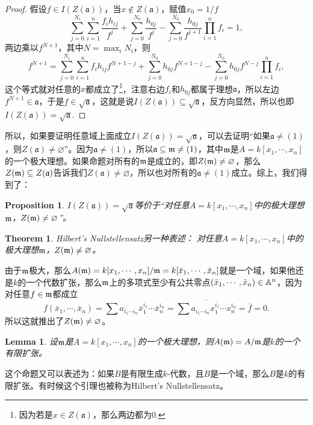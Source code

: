\documentclass[9pt]{extarticle}
\theoremstyle{plain}%
\newtheorem{pro}[defi]{Proposition}%
\newtheorem{theo}[defi]{Theorem}%
\newtheorem{lem}[defi]{Lemma}%
\begin{document}
\begin{proof}
	假设$f\in I(Z(\mathfrak{a}))$，当$x\notin Z(\mathfrak{a})$，赋值$x_0=1/f$
	\[
		\sum_{j=0}^{N_i}\sum_{i=1}^{n}\frac{f_ih_{ij}}{f^j}+\sum_{j=0}^{N_{0}}\frac{h_{0j}}{f^j}-\sum_{j=0}^{N_{0}}\frac{h_{0j}}{f^{j+1}}\prod_{i=1}^nf_i=1,
	\]
	两边乘以$f^{N+1}$，其中$N=\max_iN_i$，则
	\[
		f^{N+1}=\sum_{j=0}^{N_i}\sum_{i=1}^{n}f_ih_{ij}f^{N+1-j}+\sum_{j=0}^{N_{0}}h_{0j}f^{N+1-j}-\sum_{j=0}^{N_{0}}h_{0j}f^{N-j}\prod_{i=1}^nf_i,
	\]
	这个等式就对任意的$x$都成立了\footnote{因为若是$x\in Z(\mathfrak{a})$，那么两边都为$0$.}，注意右边$f_i$和$h_{0j}$都属于理想$\mathfrak{a}$，所以左边$f^{N+1}\in \mathfrak{a}$，于是$f\in \sqrt{\mathfrak{a}}$，这就是说$I(Z(\mathfrak{a}))\subseteq \sqrt{\mathfrak{a}}$，反方向显然，所以也即$I(Z(\mathfrak{a}))=\sqrt{\mathfrak{a}}$.
\end{proof}
	
所以，如果要证明任意域上面成立$I(Z(\mathfrak{a}))=\sqrt{\mathfrak{a}}$，可以去证明“如果$\mathfrak{a}\neq(1)$，则$Z(\mathfrak{a})\neq\varnothing$”。因为$\mathfrak{a}\neq(1)$，所以$\mathfrak{a}\subseteq \mathfrak{m} \neq(1)$，其中$\mathfrak{m}$是$A=k[x_1,\cdots,x_n]$的一个极大理想。如果命题对所有的$\mathfrak{m}$是成立的，即$Z(\mathfrak{m})\neq \varnothing$，那么$Z(\mathfrak{m})\subseteq Z(\mathfrak{a})$告诉我们$Z(\mathfrak{a})\neq \varnothing$，所以也对所有的$\mathfrak{a}\neq (1)$成立。综上，我们得到了：
\begin{pro}
$I(Z(\mathfrak{a}))=\sqrt{\mathfrak{a}}$等价于“对任意$A=k[x_1,\cdots,x_n]$中的极大理想$\mathfrak{m}$，$Z(\mathfrak{m})\neq\varnothing$”。
\end{pro}
\begin{theo}Hilbert's Nullstellensatz另一种表述：
对任意$A=k[x_1,\cdots,x_n]$中的极大理想$\mathfrak{m}$，$Z(\mathfrak{m})\neq\varnothing$。
\end{theo}
	由于$\mathfrak{m}$极大，那么$A(\mathfrak{m})=k[x_1,\cdots,x_n]/\mathfrak{m}=k[\bar{x}_1,\cdots,\bar{x}_n]$就是一个域，如果他还是$k$的一个代数扩张，那么$\mathfrak{m}$上的多项式至少有公共零点$(\bar{x}_1,\cdots,\bar{x}_n)\in \mathbb{A}^n$，因为对任意$f\in \mathfrak{m}$都成立
	\[
		f(\bar{x}_1,\cdots,\bar{x}_n)=\sum a_{i_1\cdots i_n} {\bar{x}}_1^{i_1}\cdots {\bar{x}}_n^{i_n}=\overline{\sum a_{i_1\cdots i_n} x_1^{i_1}\cdots x_n^{i_n}}=\bar{f}=0.
	\]
	所以这就推出了$Z(\mathfrak{m})\neq\varnothing$。
\begin{lem}
	设$\mathfrak{m}$是$A=k[x_1,\cdots,x_n]$的一个极大理想，则$A(\mathfrak{m})=A/\mathfrak{m}$是$k$的一个有限扩张。
	\label{l1.3}
\end{lem}
这个命题又可以表述为：如果$B$是有限生成$k$-代数，且$B$是一个域，那么$B$是$k$的有限扩张。有时候这个引理也被称为Hilbert's Nullstellensatz。
\end{document}
